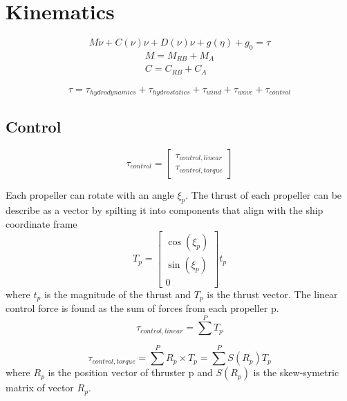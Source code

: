\documentclass[12pt,a4]{article}
\begin{document}
\section{Kinematics}
\begin{equation}
    M \dot{\nu} + C(\nu)\nu + D(\nu)\nu + g(\eta) + g_0 = \tau
\end{equation}
\begin{align*}
    M  = M_{RB} + M_A   \\
    C  = C_{RB} + C_A
\end{align*}

\begin{equation}
    \tau = \tau_{hydrodynamics}+\tau_{hydrostatics}+\tau_{wind}+\tau_{wave}+\tau_{control}
\end{equation}


\subsection{Control}
\begin{equation}
    \tau_{control} = \begin{bmatrix}
    \tau_{control,linear}\\
    \tau_{control,torque}
    \end{bmatrix}
\end{equation}

Each propeller can rotate with an angle $\xi_p$. The thrust of each propeller can be describe as a vector by spilting it into components that align with the ship coordinate frame
\begin{equation}
    T_p = \begin{bmatrix} \cos(\xi_p)\\ \sin(\xi_p)\\ 0 \end{bmatrix} t_p
\end{equation}
where $t_p$ is the magnitude of the thrust and $T_p$ is the thrust vector.
The linear control force is found as the sum of forces from each propeller p.
\begin{equation}
    \tau_{control,linear} = \sum^P T_p
\end{equation}

\begin{equation}
    \tau_{control,torque} = \sum^P  R_p \times T_p = \sum^P S(R_p) T_p
\end{equation}
where $R_p$ is the position vector of thruster p and $S(R_p)$ is the skew-symetric matrix of vector $R_p$.
\end{document}
